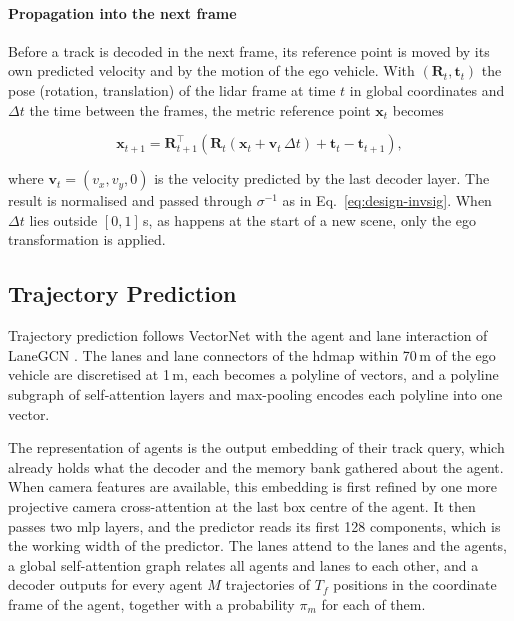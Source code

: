 \paragraph{Propagation into the next frame}
Before a track is decoded in the next frame, its reference point is moved by its own predicted velocity and
by the motion of the ego vehicle. With $(\mathbf{R}_t, \mathbf{t}_t)$ the pose (rotation, translation) of the \ac{lidar} frame at
time $t$ in global coordinates and $\Delta t$ the time between the frames, the metric reference point
$\mathbf{x}_t$ becomes

\begin{equation}
    \mathbf{x}_{t+1} = \mathbf{R}_{t+1}^{\top} \left( \mathbf{R}_t \left( \mathbf{x}_t + \mathbf{v}_t\,
    \Delta t \right) + \mathbf{t}_t - \mathbf{t}_{t+1} \right),
    \label{eq:design-propagate}
\end{equation}

where $\mathbf{v}_t = (v_x, v_y, 0)$ is the velocity predicted by the last decoder layer. The result is
normalised and passed through $\sigma^{-1}$ as in Eq.~\eqref{eq:design-invsig}. When $\Delta t$ lies outside
$[0, 1]$\,s, as happens at the start of a new scene, only the ego transformation is applied.

\subsection{Trajectory Prediction}
\label{subsec:design-prediction}

Trajectory prediction follows VectorNet \cite{VectorNet2020} with the agent and lane interaction of LaneGCN
\cite{Liang2020LaneGCN}. The lanes and lane connectors of the \ac{hdmap} within 70\,m of the ego vehicle are
discretised at 1\,m, each becomes a polyline of vectors, and a polyline subgraph of self-attention layers and
max-pooling encodes each polyline into one vector.

The representation of agents is the output embedding of
their track query, which already holds what the decoder and the memory bank gathered about the agent. When camera features are available, this
embedding is first refined by one more projective camera cross-attention at the last box centre of the
agent. It then passes two \ac{mlp} layers, and the predictor reads its first 128 components, which is the
working width of the predictor. The lanes attend to the lanes and the agents, a global self-attention graph
relates all agents and lanes to each other, and a decoder outputs for every agent $M$ trajectories of $T_f$
positions in the coordinate frame of the agent, together with a probability $\pi_m$ for each of them.

